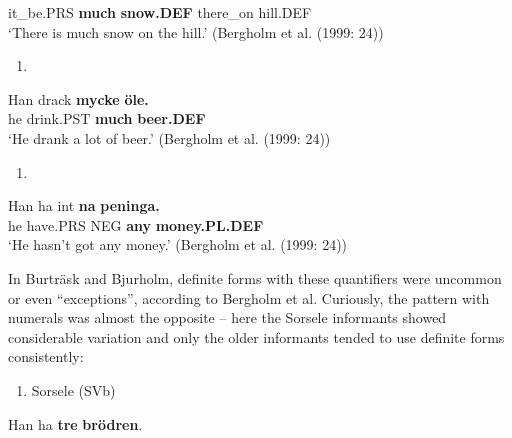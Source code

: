 it\_be.PRS  \textbf{much} \textbf{snow.DEF} there\_on  hill.DEF\\ %


‘There is much snow on the hill.’ (Bergholm et al. (1999: 24))
\z

\begin{enumerate} %
\item 
\end{enumerate} %
\ea\label{}
\gll Han  drack  \textbf{mycke} \textbf{öle.}\\


he  drink.PST  \textbf{much} \textbf{beer.DEF}\\ %


‘He drank a lot of beer.’ (Bergholm et al. (1999: 24))
\z

\begin{enumerate} %
\item 
\end{enumerate} %
\ea\label{}
\gll Han  ha  int  \textbf{na} \textbf{peninga.}\\


he  have.PRS  NEG  \textbf{any} \textbf{money.PL.DEF}\\ %


‘He hasn’t got any money.’ (Bergholm et al. (1999: 24))
\z

In Burträsk and Bjurholm, definite forms with these quantifiers were uncommon or even “exceptions”, according to Bergholm et al. Curiously, the pattern with numerals was almost the opposite – here the Sorsele informants showed considerable variation and only the older informants tended to use definite forms consistently:

\begin{enumerate} %
\item 
Sorsele (SVb) 

\end{enumerate} %
\ea\label{}
\gll Han  ha  \textbf{tre} \textbf{brödr}\textbf{en}.\\


